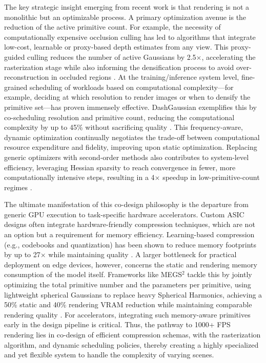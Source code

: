 \documentclass[11pt,a4paper]{article}
\begin{document}
The key strategic insight emerging from recent work is that rendering is not a monolithic but an optimizable process. A primary optimization avenue is the reduction of the active primitive count. For example, the necessity of computationally expensive occlusion culling has led to algorithms that integrate low-cost, learnable or proxy-based depth estimates from any view. This proxy-guided culling reduces the number of active Gaussians by 2.5$\times$, accelerating the rasterization stage while also informing the densification process to avoid over-reconstruction in occluded regions \cite{arxiv:2509.24421v5}. At the training/inference system level, fine-grained scheduling of workloads based on computational complexity---for example, deciding at which resolution to render images or when to densify the primitive set---has proven immensely effective. DashGaussian exemplifies this by co-scheduling resolution and primitive count, reducing the computational complexity by up to 45\% without sacrificing quality \cite{arxiv:2503.18402v2}. This frequency-aware, dynamic optimization continually negotiates the trade-off between computational resource expenditure and fidelity, improving upon static optimization. Replacing generic optimizers with second-order methods also contributes to system-level efficiency, leveraging Hessian sparsity to reach convergence in fewer, more computationally intensive steps, resulting in a 4$\times$ speedup in low-primitive-count regimes \cite{arxiv:2504.12905v3}.

The ultimate manifestation of this co-design philosophy is the departure from generic GPU execution to task-specific hardware accelerators. Custom ASIC designs often integrate hardware-friendly compression techniques, which are not an option but a requirement for memory efficiency. Learning-based compression (e.g., codebooks and quantization) has been shown to reduce memory footprints by up to 27$\times$ while maintaining quality \cite{arxiv:2406.17074v1}. A larger bottleneck for practical deployment on edge devices, however, concerns the static and rendering memory consumption of the model itself. Frameworks like MEGS$^{2}$ tackle this by jointly optimizing the total primitive number and the parameters per primitive, using lightweight spherical Gaussians to replace heavy Spherical Harmonics, achieving a 50\% static and 40\% rendering VRAM reduction while maintaining comparable rendering quality \cite{arxiv:2509.07021v3}. For accelerators, integrating such memory-aware primitives early in the design pipeline is critical. Thus, the pathway to 1000+ FPS rendering lies in co-design of efficient compression schemas, with the rasterization algorithm, and dynamic scheduling policies, thereby creating a highly specialized and yet flexible system to handle the complexity of varying scenes.
\end{document}
